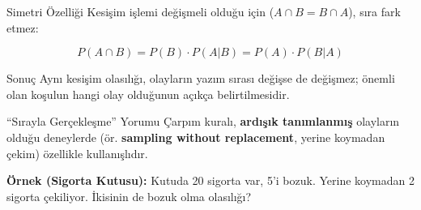 \documentclass[light]{lutbeamer}
\begin{document}
\begin{frame}[fragile]{Simetri Özelliği}
    Kesişim işlemi değişmeli olduğu için ($A \cap B = B \cap A$), sıra fark etmez:

    \[ P(A \cap B) = P(B) \cdot P(A|B) = P(A) \cdot P(B|A) \]

    \begin{alertblock}{Sonuç}
        Aynı kesişim olasılığı, olayların yazım sırası değişse de değişmez; önemli olan
        koşulun hangi olay olduğunun açıkça belirtilmesidir.
    \end{alertblock}
\end{frame}

\begin{frame}[fragile]{``Sırayla Gerçekleşme'' Yorumu}
    Çarpım kuralı, \textbf{ardışık tanımlanmış} olayların olduğu deneylerde (ör. \textbf{sampling without replacement}, yerine koymadan çekim) özellikle kullanışlıdır.

    \textbf{Örnek (Sigorta Kutusu):}
    Kutuda 20 sigorta var, 5'i bozuk. Yerine koymadan 2 sigorta çekiliyor. İkisinin de bozuk olma olasılığı?
    

\end{frame}
\end{document}
